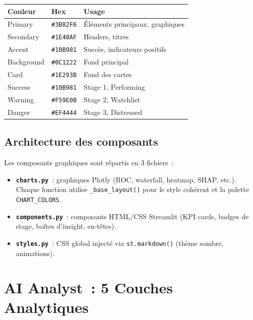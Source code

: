 \documentclass[12pt,a4paper]{article}
\begin{document}
\begin{center}
\begin{tabular}{llp{5cm}}
\toprule
\textbf{Couleur} & \textbf{Hex} & \textbf{Usage} \\
\midrule
Primary & \texttt{\#3B82F6} & \'El\'ements principaux, graphiques \\
Secondary & \texttt{\#1E40AF} & Headers, titres \\
Accent & \texttt{\#10B981} & Succ\`es, indicateurs positifs \\
Background & \texttt{\#0C1222} & Fond principal \\
Card & \texttt{\#1E293B} & Fond des cartes \\
Success & \texttt{\#10B981} & Stage 1, Performing \\
Warning & \texttt{\#F59E0B} & Stage 2, Watchlist \\
Danger & \texttt{\#EF4444} & Stage 3, Distressed \\
\bottomrule
\end{tabular}
\end{center}

\subsection{Architecture des composants}

Les composants graphiques sont r\'epartis en 3 fichiers~:

\begin{itemize}[noitemsep]
    \item \textbf{\texttt{charts.py}}~: graphiques Plotly (ROC, waterfall, heatmap, SHAP, etc.). Chaque fonction utilise \texttt{\_base\_layout()} pour le style coh\'erent et la palette \texttt{CHART\_COLORS}.
    \item \textbf{\texttt{components.py}}~: composants HTML/CSS Streamlit (KPI cards, badges de stage, bo\^ites d'insight, en-t\^etes).
    \item \textbf{\texttt{styles.py}}~: CSS global inject\'e via \texttt{st.markdown()} (th\`eme sombre, animations).
\end{itemize}


\section{AI Analyst~: 5 Couches Analytiques}
\label{sec:ai}
\end{document}
